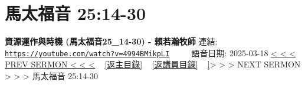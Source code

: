 \documentclass{book}
\begin{document}
\section{馬太福音 25:14-30}
\label{sec:4994BMikpLI}
\textbf{資源運作與時機 (馬太福音25\_14-30) - 賴若瀚牧師}
\newline
\newline
連結: \href{https://youtube.com/watch?v=4994BMikpLI}{\texttt{https://youtube.com/watch?v=4994BMikpLI}} ~~~~ 語音日期: 2025-03-18
\newline
\newline
\hyperref[sec:srCkvhUNl9w]{< < < PREV SERMON < < <}
~
\hyperlink{toc}{[返主目錄]}
~
\hyperref[ch:preacher13]{[返講員目錄]}
~
\hyperref[sec:fRyhfftiI8]]{> > > NEXT SERMON > > >}
\newline
\newline
馬太福音 25:14-30
\newline
\end{document}
